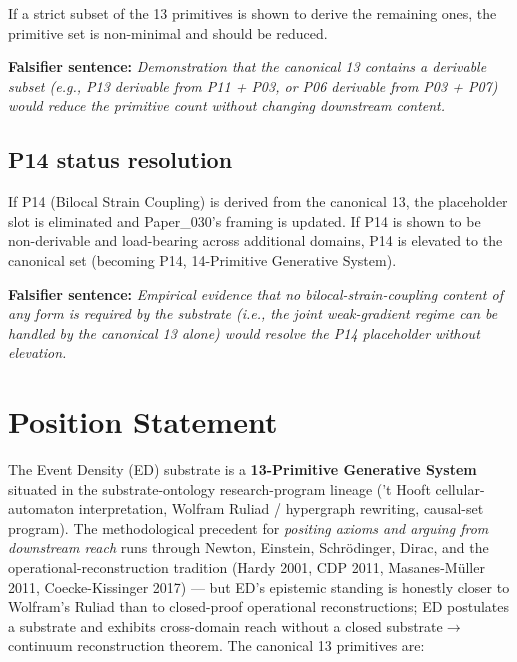 \documentclass[11pt,a4paper]{article}
\begin{document}
If a strict subset of the 13 primitives is shown to derive the remaining ones, the primitive set is non-minimal and should be reduced.

\textbf{Falsifier sentence:} \emph{Demonstration that the canonical 13 contains a derivable subset (e.g., P13 derivable from P11 + P03, or P06 derivable from P03 + P07) would reduce the primitive count without changing downstream content.}

\subsection{P14 status resolution}

If P14 (Bilocal Strain Coupling) is derived from the canonical 13, the placeholder slot is eliminated and Paper\_030's framing is updated. If P14 is shown to be non-derivable and load-bearing across additional domains, P14 is elevated to the canonical set (becoming P14, 14-Primitive Generative System).

\textbf{Falsifier sentence:} \emph{Empirical evidence that no bilocal-strain-coupling content of any form is required by the substrate (i.e., the joint weak-gradient regime can be handled by the canonical 13 alone) would resolve the P14 placeholder without elevation.}

\section{Position Statement}

The Event Density (ED) substrate is a \textbf{13-Primitive Generative System} situated in the substrate-ontology research-program lineage ('t Hooft cellular-automaton interpretation, Wolfram Ruliad / hypergraph rewriting, causal-set program). The methodological precedent for \emph{positing axioms and arguing from downstream reach} runs through Newton, Einstein, Schr\"odinger, Dirac, and the operational-reconstruction tradition (Hardy 2001, CDP 2011, Masanes-M\"uller 2011, Coecke-Kissinger 2017) --- but ED's epistemic standing is honestly closer to Wolfram's Ruliad than to closed-proof operational reconstructions; ED postulates a substrate and exhibits cross-domain reach without a closed substrate$\to$continuum reconstruction theorem. The canonical 13 primitives are:
\end{document}
